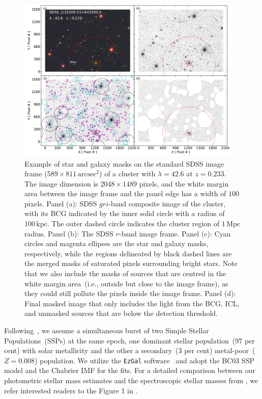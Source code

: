 \documentclass[fleqn,usenatbib]{mnras}
\newcommand{\sqarcsec}{\mathrm{arcsec}^{2}}
\newcommand{\mpc}{\mathrm{Mpc}}
\newcommand{\kpc}{\mathrm{kpc}}
\begin{document}
\begin{figure}
\centering\includegraphics[width=0.96\textwidth]{fig/img_process.pdf}
\caption{Example of star and galaxy masks on the standard
    SDSS image frame ($589{\times} 811\,\sqarcsec$) of a cluster with
    $\lambda{=}42.6$ at $z=0.233$. The image dimension is
    $2048{\times}1489$ pixels, and the white margin area between the image
    frame and the panel edge has a width of $100$ pixels. Panel (a):
    SDSS $gri$-band composite image of the cluster, with its BCG indicated
    by the inner solid circle with a radius of $100\,\kpc$. The outer
    dashed circle indicates the cluster region of $1\,\mpc$ radius. Panel
    (b): The SDSS $r$-band image frame. Panel (c): Cyan circles and magenta
    ellipses are the star and galaxy masks, respectively, while the regions
    delineated by black dashed lines are the merged masks of saturated
    pixels surrounding bright stars. Note that we also include the masks of
    sources that are centred in the white margin area~(i.e., outside but
    close to the image frame), as they could still pollute the pixels
    inside the image frame. Panel (d): Final masked image that only
    includes the light from the BCG, ICL, and unmasked sources that are
    below the detection threshold. \label{fig:demo_mask} }
\end{figure}

Following~\citet{Maraston2009}, we assume a simultaneous burst of two
Simple Stellar Populations~(SSPs)
at the same epoch, one dominant stellar population~(97 per cent) with solar
metallicity and the other a secondary~(3 per cent) metal-poor~($Z{=}0.008$)
population.  We utilize the \texttt{EzGal} software~\citep{Mancone2012} and
adopt the BC03 SSP model and the Chabrier IMF for the fits. For a detailed
comparison between our photometric stellar mass estimates and the
spectroscopic stellar masses from \citet{Chen2012}, we refer interested
readers to the Figure 1 in .
\end{document}
